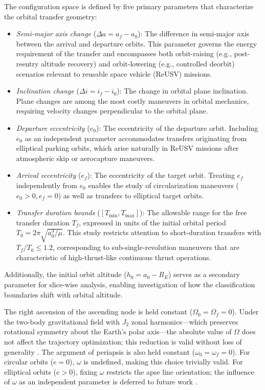 \documentclass[a4paper,fleqn]{cas-dc}
\begin{document}
The configuration space is defined by five primary parameters that characterize the orbital transfer geometry:

\begin{itemize}
\item \textit{Semi-major axis change} ($\Delta a = a_f - a_0$): The difference in semi-major axis between the arrival and departure orbits. This parameter governs the energy requirement of the transfer and encompasses both orbit-raising (e.g., post-reentry altitude recovery) and orbit-lowering (e.g., controlled deorbit) scenarios relevant to reusable space vehicle (ReUSV) missions.

\item \textit{Inclination change} ($\Delta i = i_f - i_0$): The change in orbital plane inclination. Plane changes are among the most costly maneuvers in orbital mechanics, requiring velocity changes perpendicular to the orbital plane.

\item \textit{Departure eccentricity} ($e_0$): The eccentricity of the departure orbit. Including $e_0$ as an independent parameter accommodates transfers originating from elliptical parking orbits, which arise naturally in ReUSV missions after atmospheric skip or aerocapture maneuvers.

\item \textit{Arrival eccentricity} ($e_f$): The eccentricity of the target orbit. Treating $e_f$ independently from $e_0$ enables the study of circularization maneuvers ($e_0 > 0, e_f = 0$) as well as transfers to elliptical target orbits.

\item \textit{Transfer duration bounds} ($[T_{\min}, T_{\max}]$): The allowable range for the free transfer duration $T_f$, expressed in units of the initial orbital period $T_0 = 2\pi\sqrt{a_0^3/\mu}$. This study restricts attention to short-duration transfers with $T_f/T_0 \leq 1.2$, corresponding to sub-single-revolution maneuvers that are characteristic of high-thrust-like continuous thrust operations.
\end{itemize}

Additionally, the initial orbit altitude ($h_0 = a_0 - R_E$) serves as a secondary parameter for slice-wise analysis, enabling investigation of how the classification boundaries shift with orbital altitude.

The right ascension of the ascending node is held constant ($\Omega_0 = \Omega_f = 0$). Under the two-body gravitational field with $J_2$ zonal harmonics---which preserves rotational symmetry about the Earth's polar axis---the absolute value of $\Omega$ does not affect the trajectory optimization; this reduction is valid without loss of generality \citep{Vallado2013}. The argument of periapsis is also held constant ($\omega_0 = \omega_f = 0$). For circular orbits ($e = 0$), $\omega$ is undefined, making this choice trivially valid. For elliptical orbits ($e > 0$), fixing $\omega$ restricts the apse line orientation; the influence of $\omega$ as an independent parameter is deferred to future work \citep{Curtis2020}.
\end{document}
